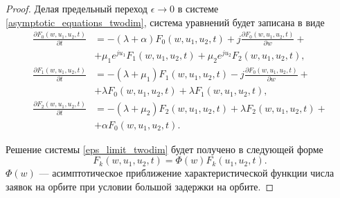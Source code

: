 \begin{proof}
	Делая предельный переход $\epsilon \xrightarrow{} 0$ в системе \eqref{asymptotic_equations_twodim}, система уравнений будет записана в виде
	\begin{equation} \label{eps_limit_twodim}
		\begin{split}
			\frac{{\partial F_{0}(w,u_{1},u_{2},t)}}{{\partial t}} &= -(\lambda + \alpha)F_{0}(w,u_{1},u_{2},t) + j
			\frac{{\partial F_{0}(w,u_{1},u_{2},t)}}{{\partial w}} +\\  &+ \mu_{1} e^{ju_{1}}F_{1}(w,u_{1},u_{2},t) + \mu_{2}e^{ju_{2}}F_{2}(w,u_{1},u_{2},t) ,
			\\
			\frac{{\partial F_{1}(w,u_{1},u_{2},t)}}{{\partial t}} &= -(\lambda + \mu_{1})F_{1}(w,u_{1},u_{2},t) - j 
			\frac{{\partial F_{0}(w,u_{1},u_{2},t)}}{{\partial w}} +\\  &+ \lambda F_{0}(w,u_{1},u_{2},t) + \lambda F_{1}(w,u_{1},u_{2},t) ,
			\\
			\frac{{\partial F_{2}(w,u_{1},u_{2},t)}}{{\partial t}} &= -(\lambda + \mu_{2})F_{2}(w,u_{1},u_{2},t)  + \lambda F_{2}(w,u_{1},u_{2},t) +\\  &+ \alpha F_{0}(w,u_{1},u_{2},t).
		\end{split}
	\end{equation}  

	Решение системы \eqref{eps_limit_twodim} будет получено в следующей форме
	\begin{equation} \label{solution_twodim}
		F_{k}(w,u_{1},u_{2},t) = \Phi(w)F_{k}(u_{1},u_{2},t).
	\end{equation}  
	$\Phi(w)$ --- асимптотическое приближение характеристической функции числа заявок на орбите при условии большой задержки на орбите.
	

\end{proof}
